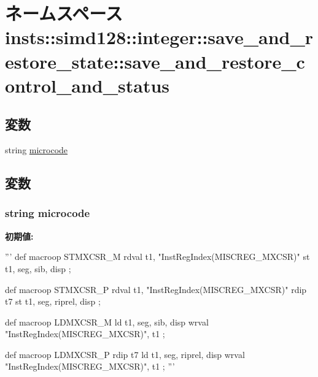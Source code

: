 \hypertarget{namespaceinsts_1_1simd128_1_1integer_1_1save__and__restore__state_1_1save__and__restore__control__and__status}{
\section{ネームスペース insts::simd128::integer::save\_\-and\_\-restore\_\-state::save\_\-and\_\-restore\_\-control\_\-and\_\-status}
\label{namespaceinsts_1_1simd128_1_1integer_1_1save__and__restore__state_1_1save__and__restore__control__and__status}
}
\subsection*{変数}
\begin{DoxyCompactItemize}
\item 
string \hyperlink{namespaceinsts_1_1simd128_1_1integer_1_1save__and__restore__state_1_1save__and__restore__control__and__status_a770f11a173e99389a8802f0107ed8f52}{microcode}
\end{DoxyCompactItemize}


\subsection{変数}
\hypertarget{namespaceinsts_1_1simd128_1_1integer_1_1save__and__restore__state_1_1save__and__restore__control__and__status_a770f11a173e99389a8802f0107ed8f52}{
\subsubsection[{microcode}]{\setlength{\rightskip}{0pt plus 5cm}string {\bf microcode}}}
\label{namespaceinsts_1_1simd128_1_1integer_1_1save__and__restore__state_1_1save__and__restore__control__and__status_a770f11a173e99389a8802f0107ed8f52}
{\bfseries 初期値:}
\begin{DoxyCode}
'''
def macroop STMXCSR_M {
    rdval t1, "InstRegIndex(MISCREG_MXCSR)"
    st t1, seg, sib, disp
};

def macroop STMXCSR_P {
    rdval t1, "InstRegIndex(MISCREG_MXCSR)"
    rdip t7
    st t1, seg, riprel, disp
};

def macroop LDMXCSR_M {
    ld t1, seg, sib, disp
    wrval "InstRegIndex(MISCREG_MXCSR)", t1
};

def macroop LDMXCSR_P {
    rdip t7
    ld t1, seg, riprel, disp
    wrval "InstRegIndex(MISCREG_MXCSR)", t1
};
'''
\end{DoxyCode}
